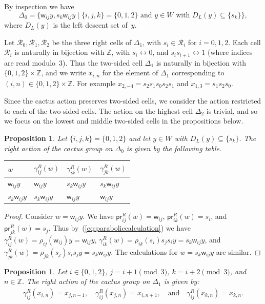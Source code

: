 \documentclass[11pt]{article}
\theoremstyle{plain}
\newtheorem{prop}[thm]{Proposition}
\theoremstyle{definition}
\numberwithin{equation}{section}
\def\pr{\mathsf{pr}}
\def\cR{\mathcal{R}}
\def\ZZ{\mathbb{Z}}
\newcommand{\sw}{\mathsf{w}}
\begin{document}
By inspection we have
$$
\Delta_0=\{\sw_{ij}y,s_k\sw_{ij}y\mid \{i,j,k\}=\{0,1,2\}\text{ and $y\in W$ with $D_L(y)\subseteq \{s_k\}$}\},
$$
where $D_L(y)$ is the left descent set of~$y$. 



Let $\cR_0,\cR_1,\cR_2$ be the three right cells of $\Delta_1$, with $s_i\in\cR_i$ for $i=0,1,2$. Each cell $\cR_i$ is naturally in bijection with $\ZZ$, with $s_i\leftrightarrow 0$, and $s_is_{i+1}\leftrightarrow 1$ (where indices are read modulo~$3$). Thus the two-sided cell $\Delta_1$ is naturally in bijection with $\{0,1,2\}\times \ZZ$, and we write $x_{i,n}$ for the element of $\Delta_1$ corresponding to $(i,n)\in\{0,1,2\}\times\ZZ$. For example $x_{2,-4}=s_2s_1s_0s_2s_1$ and $x_{1,3}=s_1s_2s_0$. 

Since the cactus action preserves two-sided cells, we consider the action restricted to each of the two-sided cells. The action on the highest cell $\Delta_2$ is trivial, and so we focus on the lowest and middle two-sided cells in the propositions below. 


\begin{prop}\label{prop:Delta0}
Let $\{i,j,k\}=\{0,1,2\}$ and let $y\in W$ with $D_L(y)\subseteq \{s_k\}$. The right action of the cactus group on $\Delta_0$ is given by the following table. 
\begin{center}
\begin{tabular}{l||l|l|l|}
$w$&$\gamma_{ij}^R(w)$&$\gamma_{ik}^R(w)$&$\gamma_{jk}^R(w)$\\
\hline\hline
$\sw_{ij}y$&$\sw_{ij}y$&$s_k\sw_{ij}y$&$s_k\sw_{ij}y$\\
\hline
$s_k\sw_{ij}y$&$s_k\sw_{ij}y$&$\sw_{ij}y$&$\sw_{ij}y$\\
\hline
\end{tabular}
\end{center}
\end{prop}

\begin{proof}
Consider $w=\sw_{ij}y$. We have $\pr_{ij}^R(w)=\sw_{ij}$, $\pr_{ik}^R(w)=s_i$, and $\pr_{jk}^R(w)=s_j$. Thus by~(\ref{eq:paraboliccalculation}) we have $\gamma_{ij}^R(w)=\rho_{ij}(\sw_{ij})y=\sw_{ij}y$, $\gamma_{ik}^R(w)=\rho_{ik}(s_i)s_js_iy=s_k\sw_{ij}y$, and $\gamma_{jk}^R(w)=\rho_{jk}(s_j)s_is_jy=s_k\sw_{ij}y$. The calculations for $w=s_k\sw_{ij}y$ are similar. 
\end{proof}

\begin{prop}\label{prop:Delta1}
Let $i\in\{0,1,2\}$, $j=i+1\pmod{3}$, $k=i+2\pmod{3}$, and $n\in\ZZ$. The right action of the cactus group on $\Delta_1$ is given by:
\begin{align*}
\gamma_{ij}^R(x_{i,n})=x_{j,n-1},\quad
\gamma_{ij}^R(x_{j,n})=x_{i,n+1},\quad\text{and}\quad 
\gamma_{ij}^R(x_{k,n})=x_{k,n}.
\end{align*}
\end{prop}
\end{document}
